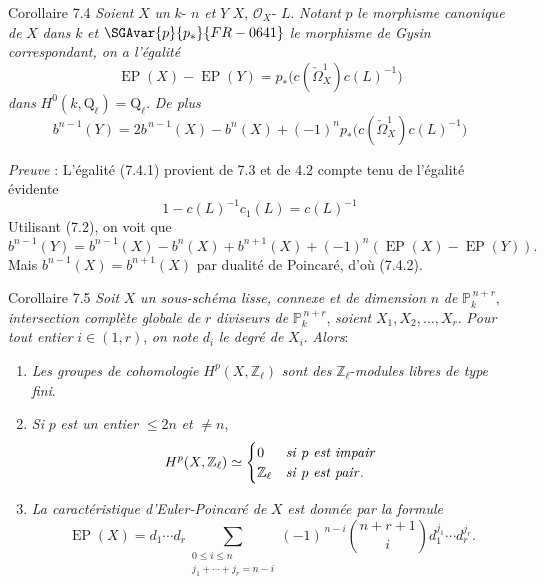 \begin{statement}{Corollaire 7.4}
\emph{Soient} $X$ \emph{un} $k$- $n$ \emph{et} $Y$  $X$,  $\mathcal{O}_X$- $L$. \emph{Notant} $p$ \emph{le morphisme canonique de} $X$ \emph{dans} $k$ \emph{et} $\SGAvar{p}{p_*}{FR-0641}$ \emph{le morphisme de Gysin correspondant, on a l'égalité}
\[
\operatorname{EP}(X)-\operatorname{EP}(Y)=p_*\bigl(c(\check\Omega_X^1)c(L)^{-1}\bigr)
\tag{7.4.1}
\]
\emph{dans} $H^0(k,\mathrm{Q}_\ell)=\mathrm{Q}_\ell$. \emph{De plus}
\[
b^{n-1}(Y)=2b^{\,n-1}(X)-b^n(X)+(-1)^n p_*\bigl(c(\check\Omega_X^1)c(L)^{-1}\bigr)
\tag{7.4.2}
\]
\end{statement}

\emph{Preuve} : L'égalité (7.4.1) provient de 7.3 et de 4.2 compte tenu de l'égalité évidente
\[
1-c(L)^{-1}c_1(L)=c(L)^{-1}
\]
Utilisant (7.2), on voit que
\[
b^{n-1}(Y)=b^{n-1}(X)-b^n(X)+b^{n+1}(X)+(-1)^n(\operatorname{EP}(X)-\operatorname{EP}(Y)).
\]
Mais $b^{n-1}(X)=b^{n+1}(X)$ par dualité de Poincaré, d'où (7.4.2).

\begin{statement}{Corollaire 7.5}
\emph{Soit} $X$ \emph{un sous-schéma lisse, connexe et de dimension} $n$ \emph{de} $\mathbb{P}_k^{\,n+r}$, \emph{intersection complète globale de} $r$ \emph{diviseurs de} $\mathbb{P}_k^{\,n+r}$, \emph{soient} $X_1,X_2,\ldots,X_r$. \emph{Pour tout entier} $i\in(1,r)$, \emph{on note} $d_i$ \emph{le degré de} $X_i$. \emph{Alors}:
\begin{enumerate}[label=(\roman*)]
\item \emph{Les groupes de cohomologie} $H^p(X,\mathbb{Z}_\ell)$ \emph{sont des} $\mathbb{Z}_\ell$-\emph{modules libres de type fini}.
\item \emph{Si} $p$ \emph{est un entier} $\le 2n$ \emph{et} $\ne n$,
\[
H^p(X,\mathbb{Z}_\ell)\simeq
\begin{cases}
0&\text{\emph{si} }p\text{ \emph{est impair}}\\
\mathbb{Z}_\ell&\text{\emph{si} }p\text{ \emph{est pair}}.
\end{cases}
\]
\item \emph{La caractéristique d'Euler-Poincaré de} $X$ \emph{est donnée par la formule}
\[
\operatorname{EP}(X)
=d_1\cdots d_r
\sum_{\substack{0\le i\le n\\ j_1+\cdots+j_r=n-i}}
(-1)^{\,n-i}\binom{n+r+1}{i}
d_1^{j_1}\cdots d_r^{j_r}.
\]
\end{enumerate}
\end{statement}

